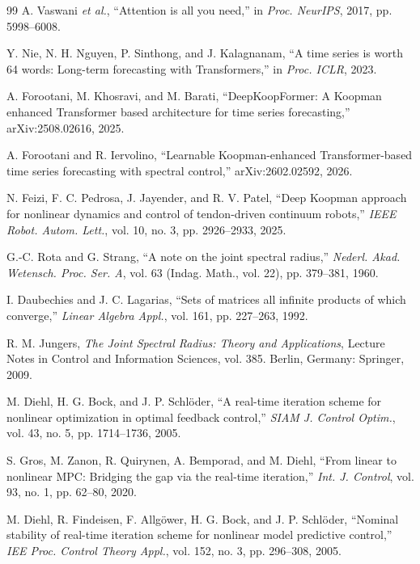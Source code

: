 ﻿\documentclass[journal]{IEEEtran}
\begin{document}
\begin{thebibliography}{99}
A. Vaswani \emph{et al.}, ``Attention is all you need,'' in \emph{Proc. NeurIPS}, 2017, pp. 5998--6008.

Y. Nie, N. H. Nguyen, P. Sinthong, and J. Kalagnanam, ``A time series is worth 64 words: Long-term forecasting with Transformers,'' in \emph{Proc. ICLR}, 2023.

A. Forootani, M. Khosravi, and M. Barati, ``DeepKoopFormer: A Koopman enhanced Transformer based architecture for time series forecasting,'' arXiv:2508.02616, 2025.

A. Forootani and R. Iervolino, ``Learnable Koopman-enhanced Transformer-based time series forecasting with spectral control,'' arXiv:2602.02592, 2026.

N. Feizi, F. C. Pedrosa, J. Jayender, and R. V. Patel, ``Deep Koopman approach for nonlinear dynamics and control of tendon-driven continuum robots,'' \emph{IEEE Robot. Autom. Lett.}, vol. 10, no. 3, pp. 2926--2933, 2025.

G.-C. Rota and G. Strang, ``A note on the joint spectral radius,'' \emph{Nederl. Akad. Wetensch. Proc. Ser. A}, vol. 63 (Indag. Math., vol. 22), pp. 379--381, 1960.

I. Daubechies and J. C. Lagarias, ``Sets of matrices all infinite products of which converge,'' \emph{Linear Algebra Appl.}, vol. 161, pp. 227--263, 1992.

R. M. Jungers, \emph{The Joint Spectral Radius: Theory and Applications}, Lecture Notes in Control and Information Sciences, vol. 385. Berlin, Germany: Springer, 2009.

M. Diehl, H. G. Bock, and J. P. Schl\"oder, ``A real-time iteration scheme for nonlinear optimization in optimal feedback control,'' \emph{SIAM J. Control Optim.}, vol. 43, no. 5, pp. 1714--1736, 2005.

S. Gros, M. Zanon, R. Quirynen, A. Bemporad, and M. Diehl, ``From linear to nonlinear MPC: Bridging the gap via the real-time iteration,'' \emph{Int. J. Control}, vol. 93, no. 1, pp. 62--80, 2020.

M. Diehl, R. Findeisen, F. Allg\"ower, H. G. Bock, and J. P. Schl\"oder, ``Nominal stability of real-time iteration scheme for nonlinear model predictive control,'' \emph{IEE Proc. Control Theory Appl.}, vol. 152, no. 3, pp. 296--308, 2005.


\end{thebibliography}
\end{document}
